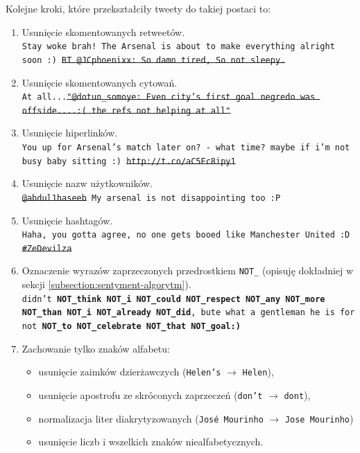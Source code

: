 Kolejne kroki, które przekształciły tweety do takiej postaci to:
\begin{enumerate}
  \item Usunięcie skomentowanych retweetów.\\
  \texttt{Stay woke brah! The Arsenal is about to make everything
  alright soon :) \sout{RT @JCphoenixx: So damn tired, So not sleepy.}}
  
  \item Usunięcie skomentowanych cytowań. \\
  \texttt{At all...\sout{"@dotun\_somoye: Even city's first goal
  negredo was offside....:( the refs not helping at all"} }
  
  \item Usunięcie hiperlinków.\\
  \texttt{You up for Arsenal's match later on? - what time? maybe if i'm not
  busy baby sitting :) \sout{http://t.co/aC5Ec8ipy1}}
 
  
  \item Usunięcie nazw użytkowników.\\
  \texttt{\sout{@abdul1haseeb} My arsenal is not disappointing too :P}
  
  
  \item Usunięcie hashtagów. \\
  \texttt{Haha, you gotta agree, no one gets booed like Manchester United :D
  \sout{\#ZeDevilza}}
  
  
  \item Oznaczenie wyrazów zaprzeczonych przedrostkiem \texttt{NOT\_} (opisuję
  dokładniej w sekcji \ref{subsection:sentyment-algorytm}). \\
  \texttt{didn't \textbf{NOT\_think NOT\_i NOT\_could NOT\_respect NOT\_any 
  NOT\_more NOT\_than NOT\_i NOT\_already NOT\_did}, bute what a gentleman he 
  is for not \textbf{NOT\_to NOT\_celebrate NOT\_that NOT\_goal:)}}

 \item Zachowanie tylko znaków alfabetu:
  	\begin{itemize}
  		\item usunięcie zaimków dzierżawczych (\texttt{Helen's} $\to$ \texttt{Helen}),
  		\item usunięcie apostrofu ze skróconych zaprzeczeń (\texttt{don't} $\to$ \texttt{dont}),
  		\item normalizacja liter diakrytyzowanych (\texttt{José Mourinho} $\to$ \texttt{Jose
  		Mourinho})
  		\item usunięcie liczb i wszelkich znaków niealfabetycznych.
	\end{itemize}


\end{enumerate}
